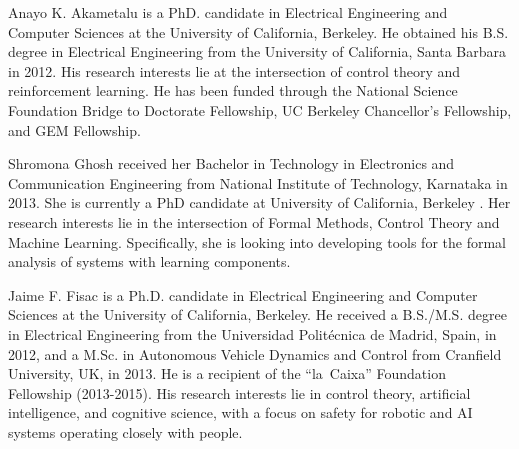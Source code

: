 

\begin{IEEEbiography}{Anayo K. Akametalu} is a PhD. candidate in Electrical Engineering and Computer Sciences at the University of California, Berkeley. He obtained his B.S. degree in Electrical Engineering from the University of California, Santa Barbara in 2012. His research interests lie at the intersection of control theory and reinforcement learning. He has been funded through the National Science Foundation Bridge to Doctorate Fellowship, UC Berkeley Chancellor's Fellowship, and GEM Fellowship.\end{IEEEbiography}
\vspace{-6cm}
\begin{IEEEbiography}{Shromona Ghosh} received her Bachelor in Technology in Electronics and Communication Engineering from National Institute of Technology, Karnataka in 2013. She is currently a PhD candidate at University of California, Berkeley . Her research interests lie in the intersection of Formal Methods, Control Theory and Machine Learning. Specifically, she is looking into developing tools for the formal analysis of systems with learning components. 
\end{IEEEbiography}
\vspace{-6cm}
\begin{IEEEbiography}{Jaime F. Fisac} is a Ph.D. candidate in Electrical Engineering and Computer Sciences at the University of California, Berkeley. He received a B.S./M.S. degree in Electrical Engineering from the Universidad Polit{\'e}cnica de Madrid, Spain, in 2012, and a M.Sc. in Autonomous Vehicle Dynamics and Control from Cranfield University, UK, in 2013. He is a recipient of the ``la~Caixa'' Foundation Fellowship (2013-2015). His research interests lie in control theory, artificial intelligence, and cognitive science, with a focus on safety for robotic and AI systems operating closely with people.
\end{IEEEbiography}

